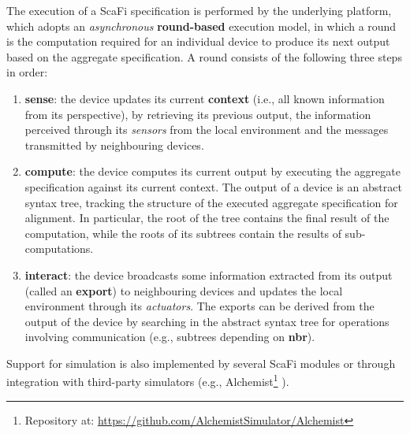 The execution of a \ac{ScaFi} specification is performed by the underlying
platform, which adopts an \textit{asynchronous} \textbf{round-based} execution
model, in which a round is the computation required for an individual device to
produce its next output based on the aggregate specification. A round consists
of the following three steps in order:
\begin{enumerate}
  \item \textbf{sense}: the device updates its current \textbf{context} (i.e.,
        all known information from its perspective), by retrieving its previous
        output, the information perceived through its \textit{sensors} from the
        local environment and the messages transmitted by neighbouring devices.
  \item \textbf{compute}: the device computes its current output by executing
        the aggregate specification against its current context. The output of
        a device is an abstract syntax tree, tracking the structure of the
        executed aggregate specification for alignment. In particular, the root
        of the tree contains the final result of the computation, while the
        roots of its subtrees contain the results of sub-computations.
  \item \textbf{interact}: the device broadcasts some information extracted
        from its output (called an \textbf{export}) to neighbouring devices and
        updates the local environment through its \textit{actuators}. The
        exports can be derived from the output of the device by searching in the
        abstract syntax tree for operations involving communication (e.g.,
        subtrees depending on \textbf{nbr}).
\end{enumerate}

Support for simulation is also implemented by several \ac{ScaFi} modules or
through integration with third-party simulators (e.g.,
Alchemist\footnote{Repository at:
\url{https://github.com/AlchemistSimulator/Alchemist}} \cite{Alchemist}).
